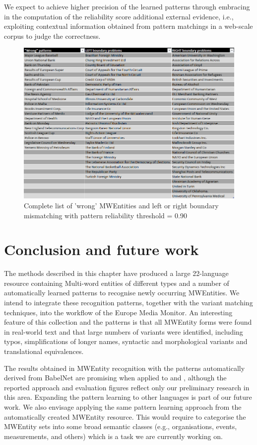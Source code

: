 \documentclass[output=paper]{langsci/langscibook}
\begin{document}
We expect to achieve higher precision of the learned patterns through
embracing in the computation of the reliability score additional
external evidence, i.e., exploiting contextual information obtained
from pattern matchings in a web-scale corpus to judge the correctness.

\begin{figure}
\centering
\includegraphics[scale=0.54]{figures/error_analysis.png}

\caption{Complete list of 'wrong' MWEntities and left or right boundary mismatching with pattern reliability threshold = 0.90}
\label{jac:fig:error_analysis}
\end{figure}


\section{Conclusion and future work}
The methods described in this chapter have produced a large 22-language resource containing Multi-word entities of different types and a number of automatically learned patterns to recognise newly occurring MWEntities. We intend to integrate these recognition patterns, together with the variant matching techniques, into the workflow of the Europe Media Monitor. An interesting feature of this collection and the patterns is that all MWEntity forms were found in real-world text and that large numbers of variants were identified, including typos, simplifications of longer names, syntactic and morphological variants and translational equivalences.

The results obtained in MWEntity recognition with the patterns automatically derived from BabelNet are promising when applied to  and , although the reported approach and evaluation figures reflect only our preliminary research in this area. Expanding the pattern learning to other languages is part of our future work. We also envisage applying the same pattern learning approach from the automatically created MWEntity resource. This would require to categorise the MWEntity sets into some broad semantic classes (e.g., organisations, events, measurements, and others) which is a task we are currently working on.
\end{document}
